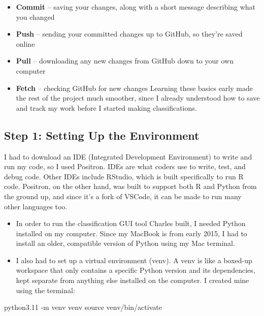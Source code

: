 \documentclass[
  letterpaper,
  DIV=11,
  numbers=noendperiod]{scrartcl}
\newenvironment{Shaded}{\begin{snugshade}}{\end{snugshade}}
\newcommand{\AttributeTok}[1]{\textcolor[rgb]{0.40,0.45,0.13}{#1}}
\newcommand{\BuiltInTok}[1]{\textcolor[rgb]{0.00,0.23,0.31}{#1}}
\newcommand{\ExtensionTok}[1]{\textcolor[rgb]{0.00,0.23,0.31}{#1}}
\newcommand{\NormalTok}[1]{\textcolor[rgb]{0.00,0.23,0.31}{#1}}
\providecommand{\tightlist}{%
  \setlength{\itemsep}{0pt}\setlength{\parskip}{0pt}}
\begin{document}
\begin{itemize}
\tightlist
\item
  \textbf{Commit} -- saving your changes, along with a short message
  describing what you changed
\item
  \textbf{Push} -- sending your committed changes up to GitHub, so
  they're saved online
\item
  \textbf{Pull} -- downloading any new changes from GitHub down to your
  own computer
\item
  \textbf{Fetch} -- checking GitHub for new changes Learning these
  basics early made the rest of the project much smoother, since I
  already understood how to save and track my work before I started
  making classifications.
\end{itemize}

\subsection{Step 1: Setting Up the
Environment}\label{step-1-setting-up-the-environment}

I had to download an IDE (Integrated Development Environment) to write
and run my code, so I used Positron. IDEs are what coders use to write,
test, and debug code. Other IDEs include RStudio, which is built
specifically to run R code. Positron, on the other hand, was built to
support both R and Python from the ground up, and since it's a fork of
VSCode, it can be made to run many other languages too.

\begin{itemize}
\tightlist
\item
  In order to run the classification GUI tool Charles built, I needed
  Python installed on my computer. Since my MacBook is from early 2015,
  I had to install an older, compatible version of Python using my Mac
  terminal.
\item
  I also had to set up a virtual environment (venv). A venv is like a
  boxed-up workspace that only contains a specific Python version and
  its dependencies, kept separate from anything else installed on the
  computer. I created mine using the terminal:
\end{itemize}

\begin{Shaded}
\begin{Highlighting}[]
\ExtensionTok{python3.11} \AttributeTok{{-}m}\NormalTok{ venv venv}
\BuiltInTok{source}\NormalTok{ venv/bin/activate}
\end{Highlighting}
\end{Shaded}
\end{document}

